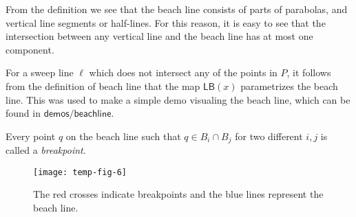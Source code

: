 \begin{ex}
\end{ex}
\begin{rmk}
From the definition we see that the beach line consists of parts of parabolas, and vertical line segments or half-lines. For this reason, it is easy to see that the intersection between any vertical line and the beach line has at most one component.
\end{rmk}
\begin{rmk}
For a sweep line $\ell$ which does not intersect any of the points in $P$, it follows from the definition of beach line that the map $\textsf{LB}(x)$ parametrizes the beach line. This was used to make a simple demo visualing the beach line, which can be found in $\boxed{\textsf{demos/beachline}}$.
\end{rmk}
\begin{defn}[Breakpoint]
Every point $q$ on the beach line such that $q \in B_i \cap B_j$ for two different $i, j$ is called a \textit{breakpoint}.
\end{defn}

\begin{figure}[H]
    \centering
    \texttt{[image: temp-fig-6]}
    \caption{The red crosses indicate breakpoints and the blue lines represent the beach line.}
    \label{fig:example-of-breakpoint}
\end{figure}

